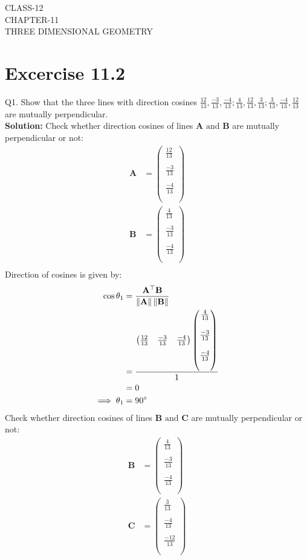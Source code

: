 \documentclass[12pt]{article}
\providecommand{\norm}[1]{\left\lVert#1\right\rVert}
\newcommand{\solution}{\noindent \textbf{Solution: }}
\newcommand{\myvec}[1]{\ensuremath{\begin{pmatrix}#1\end{pmatrix}}}
\let\vec\mathbf
\begin{document}
\begin{center}
\textbf\large{CLASS-12 \\ CHAPTER-11 \\ THREE DIMENSIONAL GEOMETRY}
\end{center}
\section*{Excercise 11.2}

Q1. Show that the three lines with direction cosines $\frac{12}{13}, \frac{-3}{13}, \frac{-4}{13}; \frac{4}{13}, \frac{12}{13}, \frac{3}{13}; \frac{3}{13}, \frac{-4}{13}, \frac{12}{13}$ are mutually perpendicular.
\\
\solution
Check whether direction cosines of lines $\vec{A} \text{ and } \vec{B}$ are mutually perpendicular or not:
		\begin{align}
\vec{A}&=\myvec{\frac{12}{13}\\\\\frac{-3}{13}\\\\\frac{-4}{13}\\\\}\\
\vec{B}&=\myvec{\frac{4}{13}\\\\\frac{-3}{13}\\\\\frac{-4}{13}\\\\}\\
		\end{align}
	Direction of cosines is given by:
		\begin{align}
			\cos\theta_1&=\frac{\vec{A}^\top\vec{B}}{\norm{\vec{A}}\norm{\vec{B}}}\\
			&=\frac{\myvec{\frac{12}{13}&\frac{-3}{13}&\frac{-4}{13}}\myvec{\frac{4}{13}\\\\\frac{-3}{13}\\\\\frac{-4}{13}\\\\}}{1}\\
			&=0\\
			\implies \theta_1&=90\degree
		\end{align}
Check whether direction cosines of lines $\vec{B} \text{ and } \vec{C}$ are mutually perpendicular or not:
                  \begin{align}
  \vec{B}&=\myvec{\frac{4}{13}\\\\\frac{-3}{13}\\\\\frac{-4}{13}\\\\}\\
  \vec{C}&=\myvec{\frac{3}{13}\\\\\frac{-4}{13}\\\\\frac{-12}{13}\\\\}\\
		  \end{align}
\end{document}
